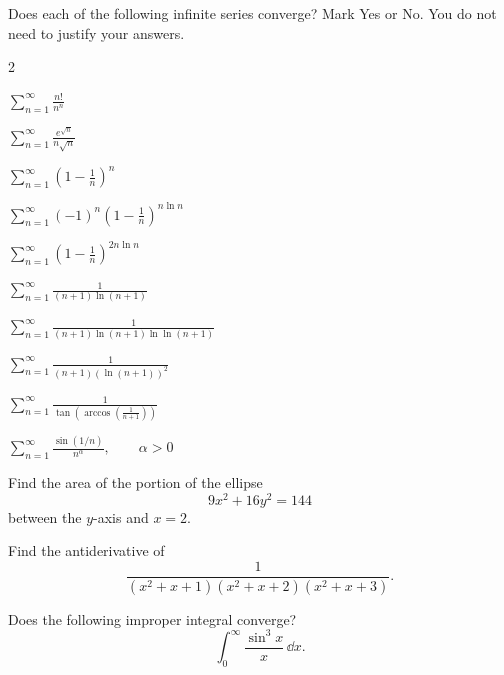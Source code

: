 \begin{problem}
Does each of the following infinite series converge? Mark Yes or No. You do not need to justify your answers.
\begin{multicols}{2}
\begin{problemchoices}
\item $\displaystyle\sum_{n=1}^{\infty}\frac{n!}{n^n}$
\item $\displaystyle\sum_{n=1}^{\infty}\frac{e^{\sqrt n}}{n\sqrt n}$
\item $\displaystyle\sum_{n=1}^{\infty}\left(1-\frac1n\right)^n$
\item $\displaystyle\sum_{n=1}^{\infty}(-1)^n\left(1-\frac1n\right)^{n\ln n}$
\item $\displaystyle\sum_{n=1}^{\infty}\left(1-\frac1n\right)^{2n\ln n}$
\item $\displaystyle\sum_{n=1}^{\infty}\frac{1}{(n+1)\ln(n+1)}$
\item $\displaystyle\sum_{n=1}^{\infty}\frac{1}{(n+1)\ln(n+1)\ln\ln(n+1)}$
\item $\displaystyle\sum_{n=1}^{\infty}\frac{1}{(n+1)(\ln(n+1))^2}$
\item $\displaystyle\sum_{n=1}^{\infty}\frac{1}{\tan\!\left(\arccos\!\left(\frac{1}{n+1}\right)\right)}$
\item $\displaystyle\sum_{n=1}^{\infty}\frac{\sin(1/n)}{n^\alpha}, \qquad \alpha>0$
\end{problemchoices}
\end{multicols}
\end{problem}

\begin{problem}
Find the area of the portion of the ellipse
\[
9x^2+16y^2=144
\]
between the $y$-axis and $x=2$.
\end{problem}

\begin{problem}
Find the antiderivative of
\[
\frac{1}{(x^2+x+1)(x^2+x+2)(x^2+x+3)}.
\]
\end{problem}

\begin{problem}
Does the following improper integral converge?
\[
\int_0^\infty \frac{\sin^3 x}{x}\,\dd x.
\]
\end{problem}

